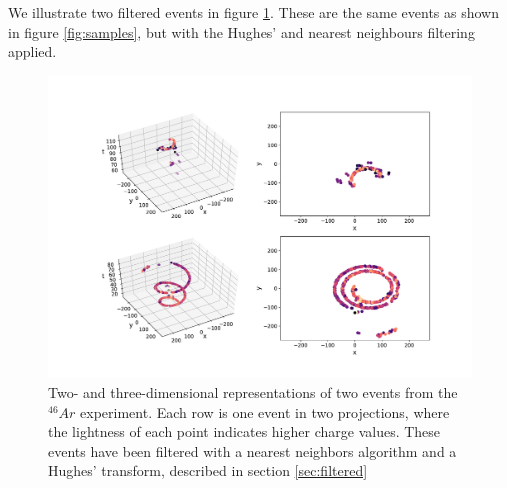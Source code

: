 We illustrate two filtered events in figure \ref{fig:samples_filtered}. These are the same events as shown in figure \ref{fig:samples}, but with the Hughes' and nearest neighbours filtering applied. 

\begin{figure}[H]
\centering
\includegraphics[width=\textwidth]{../plots/display_eventsclean_.pdf}
\caption[Displaying filtered events in 2D and 3D]{Two- and three-dimensional representations of two events from the ${}^{46}Ar$ experiment. Each row is one event in two projections, where the lightness of each point indicates higher charge values. These events have been filtered with a nearest neighbors algorithm and a Hughes' transform, described in section \ref{sec:filtered}}\label{fig:samples_filtered}
\end{figure}
